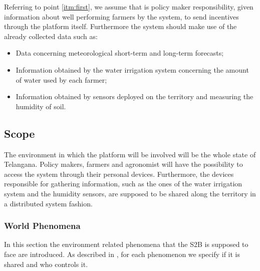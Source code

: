 Referring to point \ref{itm:first}, we assume that is policy maker responsibility, given information about well performing farmers by the system, to send incentives through the platform itself.
Furthermore the system should make use of the already collected data such as:
\begin{itemize}
    \item Data concerning meteorological short-term and long-term forecasts;
    \item Information obtained by the water irrigation system concerning the amount of water used by each farmer;
    \item Information obtained by sensors deployed on the territory and measuring the humidity of soil.
\end{itemize}


\subsection{Scope}
\label{sec:scope}
The environment in which the platform will be involved will be the whole state of Telangana. Policy makers, farmers and agronomist will have the possibility to access the system through their personal devices. Furthermore, the devices responsible for gathering information, such as the ones of the water irrigation system and the humidity sensors, are supposed to be shared along the territory in a distributed system fashion.
\newpage
\subsubsection{World Phenomena}
In this section the environment related phenomena that the S2B is supposed to face are introduced. As described in \cite{jackson_twatm}, for each phenomenon we specify if it is shared and who controls it.

